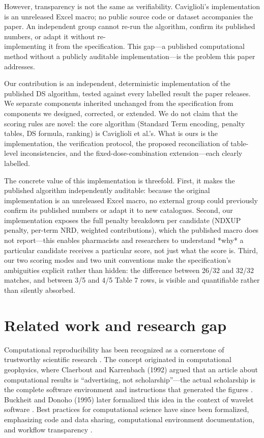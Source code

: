 \documentclass[a4paper]{elsarticle}
\begin{document}
However, transparency is not the same as verifiability. Caviglioli's implementation is an unreleased Excel macro; no public source code or dataset accompanies the paper. An independent group cannot re-run the algorithm, confirm its published numbers, or adapt it without re-\\ implementing it from the specification. This gap---a published computational method without a publicly auditable implementation---is the problem this paper addresses.

Our contribution is an independent, deterministic implementation of the published DS algorithm, tested against every labelled result the paper releases. We separate components inherited unchanged from the specification from components we designed, corrected, or extended. We do not claim that the scoring rules are novel: the core algorithm (Standard Term encoding, penalty tables, DS formula, ranking) is Caviglioli et al.'s. What is ours is the implementation, the verification protocol, the proposed reconciliation of table-level inconsistencies, and the fixed-dose-combination extension---each clearly labelled.

The concrete value of this implementation is threefold. First, it makes the published algorithm independently auditable: because the original implementation is an unreleased Excel macro, no external group could previously confirm its published numbers or adapt it to new catalogues. Second, our implementation exposes the full penalty breakdown per candidate (NDXUP penalty, per-term NRD, weighted contributions), which the published macro does not report---this enables pharmacists and researchers to understand *why* a particular candidate receives a particular score, not just what the score is. Third, our two scoring modes and two unit conventions make the specification's ambiguities explicit rather than hidden: the difference between 26/32 and 32/32 matches, and between 3/5 and 4/5 Table 7 rows, is visible and quantifiable rather than silently absorbed.

\section{Related work and research gap}
\label{sec:related}

Computational reproducibility has been recognized as a cornerstone of trustworthy scientific research \citep{nationalacademies2019reproducibility,peng2011reproducible,peng2006reproducible}. The concept originated in computational geophysics, where Claerbout and Karrenbach (1992) argued that an article about computational results is ``advertising, not scholarship''---the actual scholarship is the complete software environment and instructions that generated the figures \citep{claerbout1992electronic}. Buckheit and Donoho (1995) later formalized this idea in the context of wavelet software \citep{buckheit1995wavelab}. Best practices for computational science have since been formalized, emphasizing code and data sharing, computational environment documentation, and workflow transparency \citep{stodden2014reproducible,stodden2014best,wilson2014best,taschuk2017ten,wilson2017good}.
\end{document}
